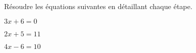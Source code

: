 
Résoudre les équations suivantes en détaillant chaque étape.

\begin{description}[leftmargin=*]
\begin{minipage}{0.3\linewidth}
\item $3x+6=0$

\end{minipage}
\hfill\vrule\hfill
\begin{minipage}{0.3\linewidth}
\item $2x+5=11$

\end{minipage}
\hfill\vrule\hfill
\begin{minipage}{0.3\linewidth}
\item $4x-6=10$

\end{minipage}
\end{description}